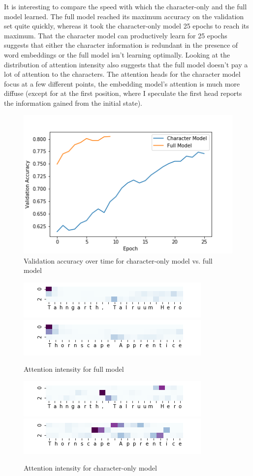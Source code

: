 \documentclass[letterpaper]{article} %
\begin{document}
It is interesting to compare the speed with which the character-only
and the full model learned.
The full model reached its maximum accuracy on the validation set quite quickly,
whereas it took the character-only model 25 epochs to reach its maximum.
That the character model can productively learn for 25 epochs
suggests that either the character information is redundant
in the presence of word embeddings
or the full model isn't learning optimally.
Looking at the distribution of attention intensity
also suggests that the full model doesn't pay a lot of attention to the characters.
The attention heads for the character model focus at a few different points,
the embedding model's attention is much more diffuse
(except for at the first position,
where I speculate the first head reports
the information gained from the initial state).

\begin{figure}
  \includegraphics[width=.5\textwidth]{training-speed-comparison}
  \caption{Validation accuracy over time for character-only model vs. full model}
\end{figure}

\begin{figure}
  \includegraphics[width=.5\textwidth]{tahngarth-attention-wv}
  \includegraphics[width=.5\textwidth]{thornscape-attention-wv}
  \caption{Attention intensity for full model}
\end{figure}

\begin{figure}
  \includegraphics[width=.5\textwidth]{tahngarth-attention-char}
  \includegraphics[width=.5\textwidth]{thornscape-attention-char}
  \caption{Attention intensity for character-only model}
\end{figure}
\end{document}
